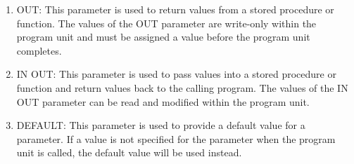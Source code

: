 \documentclass[11pt]{article}
\begin{document}
\begin{enumerate}
\begin{enumerate}
            \item OUT: This parameter is used to return values from a stored procedure or function. The values of the OUT parameter are write-only within the program unit and must be assigned a value before the program unit completes.
            
            \item IN OUT: This parameter is used to pass values into a stored procedure or function and return values back to the calling program. The values of the IN OUT parameter can be read and modified within the program unit.
            
            \item DEFAULT: This parameter is used to provide a default value for a parameter. If a value is not specified for the parameter when the program unit is called, the default value will be used instead.
        \end{enumerate}
    \end{enumerate}
\end{document}
